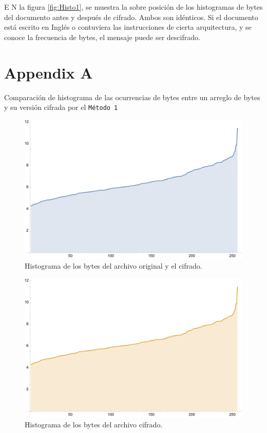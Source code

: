 \documentclass[a4paper]{article}
\begin{document}
E N la figura \ref{fig:Histo1}, se muestra la sobre posición de los histogramas
de bytes del documento antes y después de cifrado. Ambos son idénticos. Si el
documento está escrito en Inglés o contuviera las instrucciones de cierta
arquitectura, y se conoce la frecuencia de bytes, el mensaje puede ser
descifrado.


\printbibliography

\newpage

\appendix

\section*{Appendix A}

Comparación de histograma de las ocurrencias de bytes entre un arreglo de bytes
y su versión cifrada por el \texttt{Método 1}

\begin{figure}[H]
    \centering
    \includegraphics[scale=0.7]{historygramorig}
    \caption*{Histograma de los bytes del archivo
original y el cifrado.}\label{fig:d1}
\end{figure}

\begin{figure}[H]
    \centering
    \includegraphics[scale=0.7]{historygramorig2}
    \caption*{Histograma de los bytes del archivo cifrado.}
    \label{fig:d3}
\end{figure}
\end{document}
